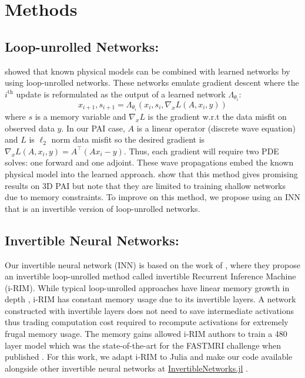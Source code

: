\documentclass[]{article}
\begin{document}
\section{Methods}\label{methods}

\subsection{Loop-unrolled Networks:}\label{loop-unrolled-networks}

\citet{hauptmann2018model} showed that known physical models can be
combined with learned networks by using loop-unrolled networks. These
networks emulate gradient descent where the $i^{\text{th}}$ update is
reformulated as the output of a learned network $\Lambda_{\theta_{i}}$:
%
\begin{equation}
x_{i+1}, s_{i+1} = \Lambda_{\theta_{i}}(x_{i},s_{i}, \nabla_{x}L(A,x_{i},y))
\label{eq:learnedgd}
\end{equation}
%
 where $s$ is a memory variable and $\nabla_{x}L$ is the gradient w.r.t
the data misfit on observed data $y$. In our PAI case, $A$ is a linear
operator (discrete wave equation) and $L$ is $\ell_2$ norm data misfit
so the desired gradient is
$\nabla_{x}L(A,x_{i},y) = A^{\top}(Ax_{i}-y)$. Thus, each gradient will
require two PDE solves: one forward and one adjoint. These wave
propagations embed the known physical model into the learned approach.
\citet{hauptmann2018model} show that this method gives promising results
on 3D PAI but note that they are limited to training shallow networks
due to memory constraints. To improve on this method, we propose using
an INN that is an invertible version of loop-unrolled networks.

\subsection{Invertible Neural
Networks:}\label{invertible-neural-networks}

Our invertible neural network (INN) is based on the work of
\citep{putzky2019rim}, where they propose an invertible loop-unrolled
method called invertible Recurrent Inference Machine (i-RIM). While
typical loop-unrolled approaches have linear memory growth in depth
\citet{hauptmann2018model}, i-RIM has constant memory usage due to its
invertible layers. A network constructed with invertible layers does not
need to save intermediate activations thus trading computation cost
required to recompute activations for extremely frugal memory usage. The
memory gains allowed i-RIM authors to train a 480 layer model which was
the state-of-the-art for the FASTMRI challenge when published
\cite{putzky2019rim}. For this work, we adapt i-RIM to Julia and make
our code available alongside other invertible neural networks at
\href{https://github.com/slimgroup/InvertibleNetworks.jl}{InvertibleNetworks.jl}
\citet{witte2020invertiblenetworks}.
\end{document}
